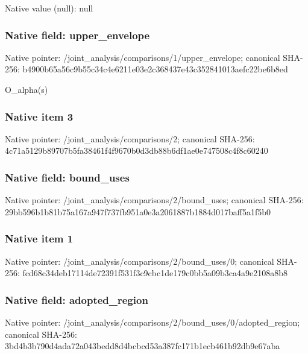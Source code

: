 \documentclass[10pt,a4paper]{article}
\begin{document}
Native value (null): null



\subsubsection{Native field: upper\_envelope}


Native pointer: /joint\_analysis/comparis\allowbreak{}ons/1/upper\_envelope; canonical SHA-256: b4900b65a56c9b55c34c4e62\allowbreak{}11e03e2c368437e43c352841\allowbreak{}013aefc22be6b8ed


O\_alpha(s)


\subsubsection{Native item 3}


Native pointer: /joint\_analysis/comparisons/2; canonical SHA-256: 4c71a5129b89707b5fa38461\allowbreak{}f4f9670b0d3db88b6df1ae0e\allowbreak{}747508c4f8c60240



\subsubsection{Native field: bound\_uses}


Native pointer: /joint\_analysis/comparis\allowbreak{}ons/2/bound\_uses; canonical SHA-256: 29bb596b1b81b75a167a947f\allowbreak{}737fb951a0e3a2061887b188\allowbreak{}4d017baff5a1f5b0



\subsubsection{Native item 1}


Native pointer: /joint\_analysis/comparis\allowbreak{}ons/2/bound\_uses/0; canonical SHA-256: fcd68c34deb17114de72391f\allowbreak{}531f3c9cbc1de179c0bb5a09\allowbreak{}b3ca4a9e2108a8b8



\subsubsection{Native field: adopted\_region}


Native pointer: /joint\_analysis/comparis\allowbreak{}ons/2/bound\_uses/0/adopt\allowbreak{}ed\_region; canonical SHA-256: 3bd4b3b790d4ada72a043bed\allowbreak{}d8d4bcbcd53a387fc171b1ec\allowbreak{}b461b92db9e67aba
\end{document}
